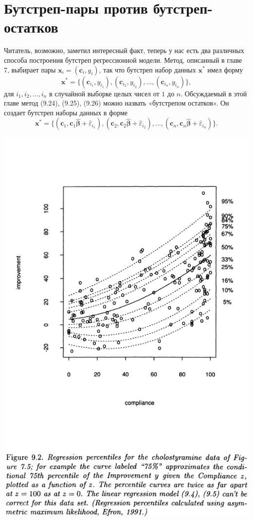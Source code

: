 \section{Бутстреп-пары против бутстреп-остатков}

Читатель, возможно, заметил интересный факт, теперь у нас есть два различных способа построения бутстреп регрессионной модели. Метод, описанный в главе 7, выбирает пары $\textbf{x}_i = (\textbf{c}_i, y_i)$, так что бутстреп набор данных $\textbf{x}^*$ имел форму
\begin{equation}
	\textbf{x}^* = \{ (\textbf{c}_{{i}_1}, y_{{i}_1}), (\textbf{c}_{{i}_2}, y_{{i}_2}), \ldots, (\textbf{c}_{{i}_n}, y_{{i}_n}) \},
\end{equation}
для $i_1, i_2, \ldots, i_n$ в случайной выборке целых чисел от $1$ до $n$. Обсуждаемый в этой главе метод (9.24), (9.25), (9.26) можно назвать «бутстрепом остатков». Он создает бутстреп наборы данных в форме
\begin{equation}
	\textbf{x}^* = \{ (\textbf{c}_1, \textbf{c}_1 \hat{\bm{\beta}} + \hat{\varepsilon}_{{i}_1}), (\textbf{c}_2, \textbf{c}_2 \hat{\bm{\beta}} + \hat{\varepsilon}_{{i}_2}), \ldots, (\textbf{c}_n, \textbf{c}_n \hat{\bm{\beta}} + \hat{\varepsilon}_{{i}_n}) \}.
\end{equation}

\noindent
\includegraphics[width=\linewidth]{9/f92}
\newline

